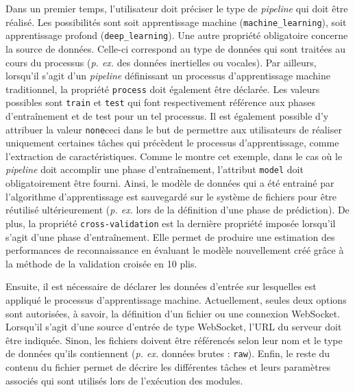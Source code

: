 Dans un premier temps, l'utilisateur doit préciser le type de \textit{pipeline} qui doit être réalisé. Les possibilités sont soit apprentissage machine (\texttt{machine\_learning}), soit apprentissage profond (\texttt{deep\_learning}). Une autre propriété obligatoire concerne la source de données. Celle-ci correspond au type de données qui sont traitées au cours du processus (\textit{p. ex.} des données inertielles ou vocales). Par ailleurs, lorsqu'il s'agit d'un \textit{pipeline} définissant un processus d'apprentissage machine traditionnel, la propriété \texttt{process} doit également être déclarée. Les valeurs possibles sont \texttt{train} et \texttt{test} qui font respectivement référence aux phases d'entraînement et de test pour un tel processus. Il est également possible d'y attribuer la valeur \texttt{none}\textemdash ceci dans le but de permettre aux utilisateurs de réaliser uniquement certaines tâches qui précèdent le processus d'apprentissage, comme l'extraction de caractéristiques. Comme le montre cet exemple, dans le cas où le \textit{pipeline} doit accomplir une phase d'entraînement, l'attribut \texttt{model} doit obligatoirement être fourni. Ainsi, le modèle de données qui a été entrainé par l'algorithme d'apprentissage est sauvegardé sur le système de fichiers pour être réutilisé ultérieurement (\textit{p. ex.} lors de la définition d'une phase de prédiction). De plus, la propriété \texttt{cross-validation} est la dernière propriété imposée lorsqu'il s'agit d'une phase d'entraînement. Elle permet de produire une estimation des performances de reconnaissance en évaluant le modèle nouvellement créé grâce à la méthode de la validation croisée en 10 plis.

Ensuite, il est nécessaire de déclarer les données d'entrée sur lesquelles est appliqué le processus d'apprentissage machine. Actuellement, seules deux options sont autorisées, à savoir, la définition d'un fichier ou une connexion WebSocket. Lorsqu'il s'agit d'une source d'entrée de type WebSocket, l'\acs{URL} du serveur doit être indiquée. Sinon, les fichiers doivent être référencés selon leur nom et le type de données qu'ils contiennent (\textit{p. ex.} données brutes : \texttt{raw}). Enfin, le reste du contenu du fichier permet de décrire les différentes tâches et leurs paramètres associés qui sont utilisés lors de l'exécution des modules.

